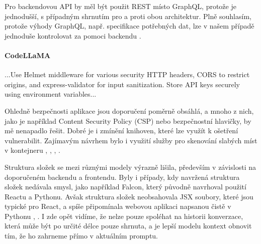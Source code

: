 \documentclass[FM,DP]{tulthesis}
\begin{document}
		Pro backendovou API by měl být použit REST místo GraphQL, protože je jednodušší, s případným shrnutím pro a proti obou architektur. Plně souhlasím, protože výhody GraphQL, např. specifikace potřebných dat, lze v našem případě jednoduše kontrolovat za pomoci backendu \cite{REST_GQL}.
		
		\vspace{0.6em}
		\vspace{0.6em}
		\begin{tcolorbox}[colback=white,colframe=black]
			\paragraph{CodeLLaMA}
			...Use Helmet middleware for various security HTTP headers, CORS to restrict origins, and express-validator for input sanitization. Store API keys securely using environment variables... \cite{claude_navrh}
		\end{tcolorbox}
		\vspace{0.6em}
		
		Ohledně bezpečnosti aplikace jsou doporučení poměrně obsáhlá, a mnoho z nich, jako je například Content Security Policy (CSP) nebo bezpečnostní hlavičky, by mě nenapadlo řešit. Dobré je i zmínění knihoven, které lze využít k ošetření vulnerabilit. Zajímavým návrhem bylo i využití služby pro skenování slabých míst v kontejneru \cite{claude_navrh}, \cite{security_headers}, \cite{docker-docs}, \cite{ibm:containers}.
		
		Struktura složek se mezi různými modely výrazně lišila, především v závislosti na doporučeném backendu a frontendu. Byly i případy, kdy navržená struktura složek nedávala smysl, jako například Falcon, který původně navrhoval použití Reactu a Pythonu. Avšak struktura složek neobsahovala JSX soubory, které jsou typické pro React, a spíše připomínala webovou aplikaci napsanou čistě v Pythonu \cite{falcon_navrh}, \cite{react}. I zde opět vidíme, že nelze pouze spoléhat na historii konverzace, která může být po určité délce pouze shrnuta, a je lepší modelu kontext obnovit tím, že ho zahrneme přímo v aktuálním promptu.
		
\end{document}
